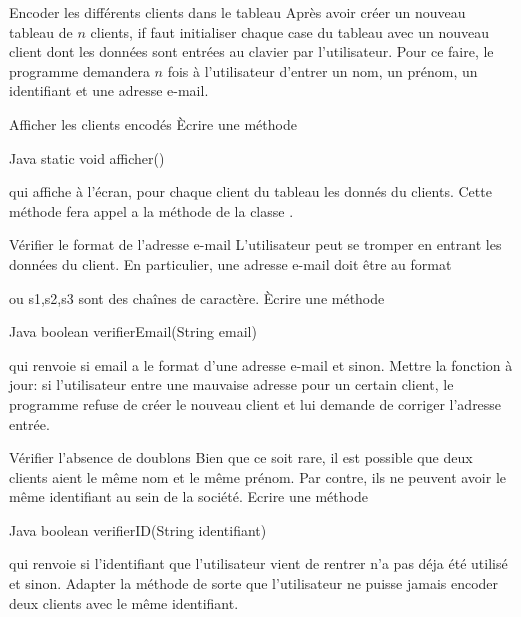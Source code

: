 \documentclass[a4paper,11pt]{article}
\begin{document}
 	\begin{Exercice}{Encoder les différents clients dans le tableau}
		Apr\`es avoir créer un nouveau tableau de $n$ clients, if faut initialiser chaque case du tableau avec un nouveau client dont les données sont entrées au clavier par l'utilisateur.
		Pour ce faire, le programme demandera $n$ fois à l'utilisateur d'entrer un nom, un prénom, un identifiant et une adresse e-mail.		
		
  \end{Exercice}
  
  	\begin{Exercice}{Afficher les clients encod\'es}
	\`Ecrire une m\'ethode
	
		\begin{Code}{Java}
		    static void afficher()
		\end{Code}
	qui affiche \`a l'\'ecran, pour chaque client du tableau  les donn\'es du clients. Cette m\'ethode fera appel a la m\'ethode  de la classe .
	\end{Exercice}

	\begin{Exercice}{V\'erifier le format de l'adresse e-mail}
		L'utilisateur peut se tromper en entrant les donn\'ees du client. En particulier, une adresse e-mail doit \^etre au format 
		
		
		ou s1,s2,s3 sont des cha\^ines de caract\`ere. \`Ecrire une m\'ethode 
		
		\begin{Code}{Java}
		boolean verifierEmail(String email)
		\end{Code}
		
		qui renvoie  si email a le format d'une adresse e-mail et  sinon.
		Mettre la fonction  \`a jour: si l'utilisateur entre une mauvaise adresse pour un certain client, le programme refuse de cr\'eer le nouveau client et lui demande de corriger      l'adresse entr\'ee.
	\end{Exercice}

\begin{Exercice}{V\'erifier l'absence de doublons}
		Bien que ce soit rare, il est possible que deux clients aient le m\^eme nom et le m\^eme pr\'enom. Par contre, ils ne peuvent avoir le m\^eme identifiant au sein de la soci\'et\'e. Ecrire une m\'ethode
		
		\begin{Code}{Java}
		boolean verifierID(String identifiant)
		\end{Code}
		
qui renvoie  si l'identifiant que l'utilisateur vient de rentrer n'a pas d\'eja \'et\'e utilis\'e et  sinon. Adapter la m\'ethode  de sorte que l'utilisateur ne puisse jamais encoder deux clients avec le m\^eme identifiant. \newpage

\end{Exercice}
\end{document}
